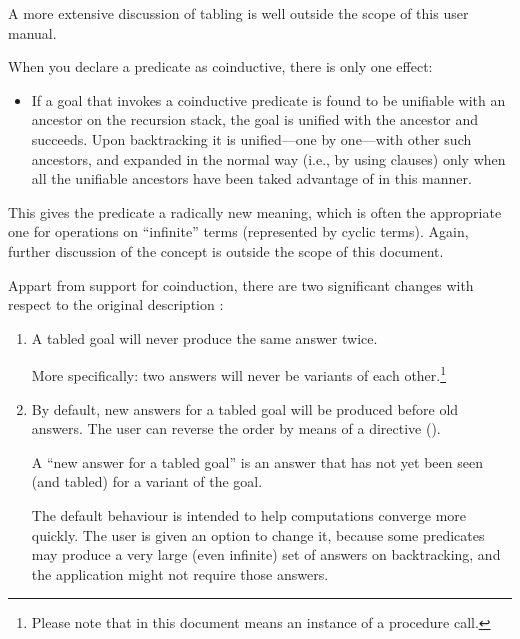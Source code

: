 A more extensive discussion of tabling is well outside the scope of this user
manual.


\breakup

When you declare a predicate as coinductive,
there is only one effect:
\begin{itemize}
  \item If a goal that invokes a coinductive predicate is found to be
    unifiable with an ancestor on the recursion stack, the goal is unified
    with the ancestor and succeeds.  Upon backtracking it is unified---one by
    one---with other such ancestors, and expanded in the normal way (i.e., by
    using clauses) only when all the unifiable ancestors have been taked
    advantage of in this manner.
\end{itemize}
This gives the predicate a radically new meaning, which is often the
appropriate one for operations on ``infinite'' terms (represented by cyclic
terms).  Again, further discussion of the concept is outside the scope of
this document.

\breakup

Appart from support for coinduction, there are two significant changes with
respect to the original description \cite{guo-gupta-dra}:
\begin{enumerate}

\item A tabled goal will never produce the same answer twice.

  More specifically: two answers will never be variants of each
  other.\footnote{
  Please note that in this document  means an instance of a
  procedure call.}

\item By default, new answers for a tabled goal will be produced before old
  answers.  The user can reverse the order by means of a directive
  ().

  A ``new answer for a tabled goal'' is an answer that has not yet been seen
  (and tabled) for a variant of the goal.

  The default behaviour is intended to help computations converge more
  quickly.  The user is given an option to change it, because some predicates
  may produce a very large (even infinite) set of answers on backtracking,
  and the application might not require those answers.
\end{enumerate}
